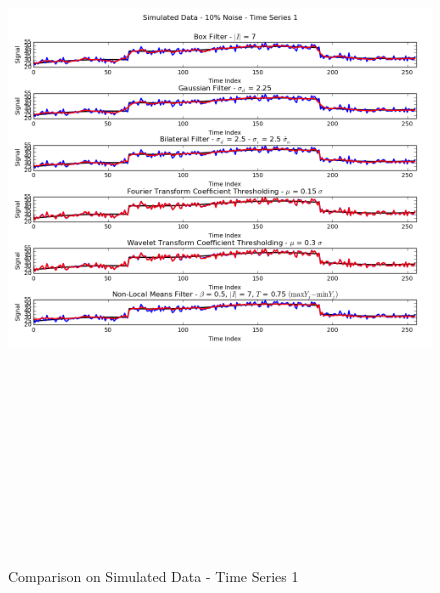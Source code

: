 \documentclass[11pt]{article}
\theoremstyle{definition}
\begin{document}
\begin{figure}[h!]
\centering
\includegraphics[width = 1 \textwidth,height = 8in]{TimeSeries1SimulatedCompare.png}
\caption{Comparison on Simulated Data - Time Series 1}
\label{timeseries1simulatedcompare}
\end{figure}
\end{document}
